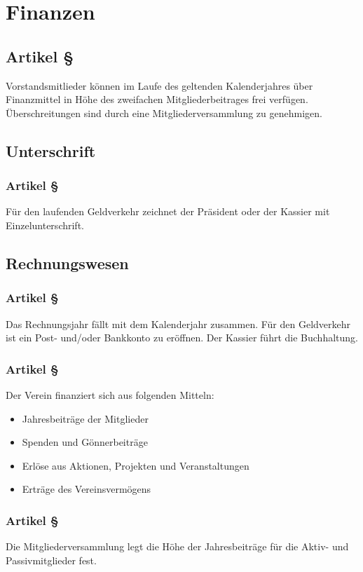 \section{Finanzen}

\subsection*{Artikel §\articlenumber}
Vorstandsmitlieder können im Laufe des geltenden 
Kalenderjahres über Finanzmittel in Höhe des zweifachen
Mitgliederbeitrages frei verfügen. Überschreitungen sind
durch eine Mitgliederversammlung zu genehmigen.

\subsection{Unterschrift}

\subsubsection*{Artikel §\articlenumber}
Für den laufenden Geldverkehr zeichnet der Präsident oder 
der Kassier mit Einzelunterschrift.

\subsection{Rechnungswesen}

\subsubsection*{Artikel §\articlenumber}
Das Rechnungsjahr fällt mit dem Kalenderjahr zusammen. Für
den Geldverkehr ist ein Post- und/oder Bankkonto zu
eröffnen. Der Kassier führt die Buchhaltung.

\subsubsection*{Artikel §\articlenumber}
Der Verein finanziert sich aus folgenden Mitteln:
\begin{itemize}
\item Jahresbeiträge der Mitglieder
\item Spenden und Gönnerbeiträge
\item Erlöse aus Aktionen, Projekten und Veranstaltungen
\item Erträge des Vereinsvermögens
\end{itemize}
 
\subsubsection*{Artikel §\articlenumber}
Die Mitgliederversammlung legt die Höhe der Jahresbeiträge 
für die Aktiv- und Passivmitglieder fest.

